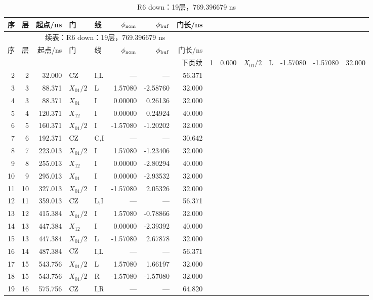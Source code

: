 {\small\setlength{\tabcolsep}{4pt}\fontsize{9}{10.6}\selectfont\renewcommand{\arraystretch}{1.0}
\begin{longtable}{@{}rrrllrrr@{}}
\caption{R6 down：19层，769.396679 ns}\label{tab:r6down}\\\toprule
序 & 层 & 起点/ns & 门 & 线 & $\phi_{\rm nom}$ & $\phi_{\rm buf}$ & 门长/ns\\\midrule\endfirsthead
\multicolumn{8}{c}{续表：R6 down：19层，769.396679 ns}\\\toprule
序 & 层 & 起点/ns & 门 & 线 & $\phi_{\rm nom}$ & $\phi_{\rm buf}$ & 门长/ns\\\midrule\endhead
\midrule\multicolumn{8}{r}{下页续}\endfoot
\bottomrule\endlastfoot
1 & 1 & 0.000 & $X_{01}/2$ & L & -1.57080 & -1.57080 & 32.000\\
2 & 2 & 32.000 & $\mathrm{CZ}$ & I,L & --- & --- & 56.371\\
3 & 3 & 88.371 & $X_{01}/2$ & L & 1.57080 & -2.58760 & 32.000\\
4 & 3 & 88.371 & $X_{01}$ & I & 0.00000 & 0.26136 & 32.000\\
5 & 4 & 120.371 & $X_{12}$ & I & 0.00000 & 0.24924 & 40.000\\
6 & 5 & 160.371 & $X_{01}/2$ & I & -1.57080 & -1.20202 & 32.000\\
7 & 6 & 192.371 & $\mathrm{CZ}$ & C,I & --- & --- & 30.642\\
8 & 7 & 223.013 & $X_{01}/2$ & I & 1.57080 & -1.23406 & 32.000\\
9 & 8 & 255.013 & $X_{12}$ & I & 0.00000 & -2.80294 & 40.000\\
10 & 9 & 295.013 & $X_{01}$ & I & 0.00000 & -2.93532 & 32.000\\
11 & 10 & 327.013 & $X_{01}/2$ & I & -1.57080 & 2.05326 & 32.000\\
12 & 11 & 359.013 & $\mathrm{CZ}$ & L,I & --- & --- & 56.371\\
13 & 12 & 415.384 & $X_{01}/2$ & I & 1.57080 & -0.78866 & 32.000\\
14 & 13 & 447.384 & $X_{12}$ & I & 0.00000 & -2.39392 & 40.000\\
15 & 13 & 447.384 & $X_{01}/2$ & L & -1.57080 & 2.67878 & 32.000\\
16 & 14 & 487.384 & $\mathrm{CZ}$ & I,L & --- & --- & 56.371\\
17 & 15 & 543.756 & $X_{01}/2$ & L & 1.57080 & 1.66197 & 32.000\\
18 & 15 & 543.756 & $X_{01}/2$ & R & -1.57080 & -1.57080 & 32.000\\
19 & 16 & 575.756 & $\mathrm{CZ}$ & I,R & --- & --- & 64.820\\

\end{longtable}}
